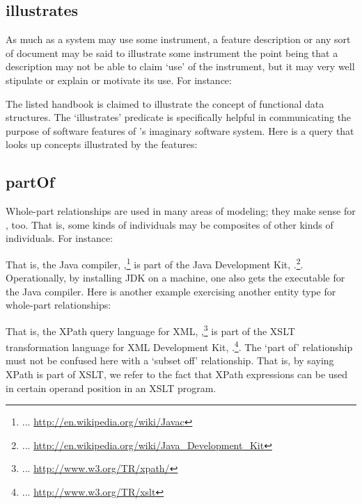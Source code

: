 
\subsection{illustrates}

As much as a system may use some instrument, a feature description or
any sort of document may be said to illustrate some instrument the
point being that a description may not be able to claim `use' of the
instrument, but it may very well stipulate or explain or motivate its
use. For instance:


\noindent
The listed handbook is claimed to illustrate the concept of functional
data structures. The `illustrates' predicate is specifically helpful
in communicating the purpose of software features of \ooo{}'s
imaginary software system. Here is a query that looks up concepts
illustrated by the features:




\subsection{partOf}

Whole-part relationships are used in many areas of modeling; they make
sense for \solasote, too. That is, some kinds of \solasote{}
individuals may be composites of other kinds of \solasote{}
individuals. For instance:


\noindent
That is, the Java compiler,
,\footnote{... 
  \url{http://en.wikipedia.org/wiki/Javac}} is part of the Java
Development Kit, .\footnote{... 
  \url{http://en.wikipedia.org/wiki/Java_Development_Kit}}. Operationally,
by installing JDK on a machine, one also gets the executable for the
Java compiler. Here is another example exercising another entity type
for whole-part relationships:


\noindent
That is, the XPath query language for XML,
,\footnote{... 
  \url{http://www.w3.org/TR/xpath/}} is part of the XSLT
transformation language for XML
Development Kit, .\footnote{... 
  \url{http://www.w3.org/TR/xslt}}. The `part of' relationship must not
be confused here with a `subset off' relationship. That is, by saying
XPath is part of XSLT, we refer to the fact that XPath expressions can
be used in certain operand position in an XSLT program. 

